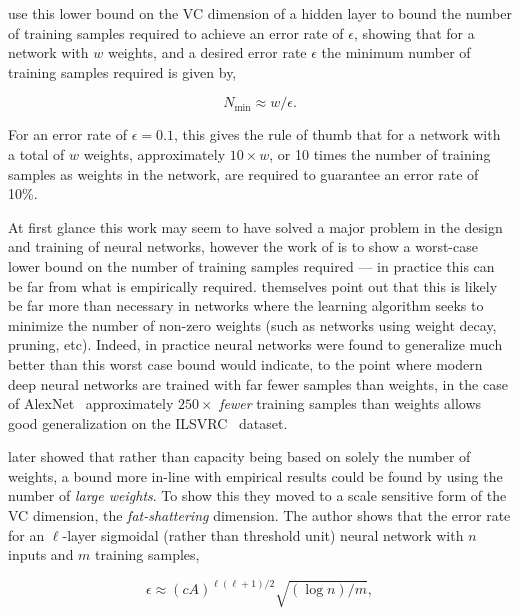 \documentclass[thesis]{subfiles}
\begin{document}
    \citet{baum1989size} use this lower bound on the VC dimension of a hidden layer to bound the number of training samples required to achieve an error rate of $\epsilon$, showing that for a network with $w$ weights, and a desired error rate $\epsilon$ the minimum number of training samples required is given by,
    
    \begin{equation}
        N_{\min} \approx w/\epsilon.
    \end{equation}
    
    For an error rate of $\epsilon=0.1$, this gives the rule of thumb that for a network with a total of $w$ weights, approximately $10\times w$, or 10 times the number of training samples as weights in the network, are required to guarantee an error rate of 10\%. 
    
    At first glance this work may seem to have solved a major problem in the design and training of neural networks, however the work of \citet{baum1989size} is to show a worst-case lower bound on the number of training samples required --- in practice this can be far from what is empirically required. \citet{baum1989size} themselves point out that this is likely be far more than necessary in networks where the learning algorithm seeks to minimize the number of non-zero weights (such as networks using weight decay, pruning, etc). Indeed, in practice neural networks were found to generalize much better than this worst case bound would indicate, to the point where modern deep neural networks are trained with far fewer samples than weights, in the case of AlexNet~\citep{Krizhevsky2012} approximately $250\times$ \emph{fewer} training samples than weights allows good generalization on the ILSVRC~\citep{ILSVRC2015} dataset.
    
    \citet{bartlett1997} later showed that rather than capacity being based on solely the number of weights, a bound more in-line with empirical results could be found by using the number of \emph{large weights}. To show this they moved to a scale sensitive form of the VC dimension, the \emph{fat-shattering} dimension. The author shows that the error rate for an $\ell$-layer sigmoidal (rather than threshold unit) neural network with $n$ inputs and $m$ training samples,
    
    \begin{equation}
        \epsilon \approx (cA)^{\ell(\ell+1)/2} \sqrt{(\log n)/m},
    \end{equation}
    
\end{document}
